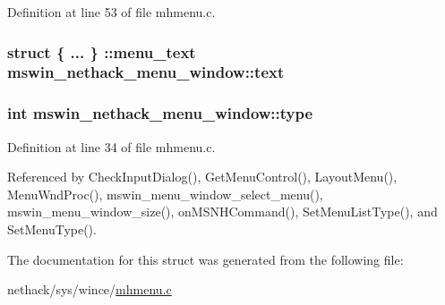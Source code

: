 Definition at line 53 of file mhmenu.\+c.

\hypertarget{structmswin__nethack__menu__window_a1b4707907cd2840714c88e2416689505}{
\subsubsection[{text}]{\setlength{\rightskip}{0pt plus 5cm}struct \{ ... \} \+::menu\+\_\+text  mswin\+\_\+nethack\+\_\+menu\+\_\+window\+::text}}\label{structmswin__nethack__menu__window_a1b4707907cd2840714c88e2416689505}
\hypertarget{structmswin__nethack__menu__window_ab0fda81d90930a6d45dd16aeb8ce4f8a}{
\subsubsection[{type}]{\setlength{\rightskip}{0pt plus 5cm}int mswin\+\_\+nethack\+\_\+menu\+\_\+window\+::type}}\label{structmswin__nethack__menu__window_ab0fda81d90930a6d45dd16aeb8ce4f8a}


Definition at line 34 of file mhmenu.\+c.



Referenced by Check\+Input\+Dialog(), Get\+Menu\+Control(), Layout\+Menu(), Menu\+Wnd\+Proc(), mswin\+\_\+menu\+\_\+window\+\_\+select\+\_\+menu(), mswin\+\_\+menu\+\_\+window\+\_\+size(), on\+M\+S\+N\+H\+Command(), Set\+Menu\+List\+Type(), and Set\+Menu\+Type().



The documentation for this struct was generated from the following file\+:\begin{DoxyCompactItemize}
\item 
nethack/sys/wince/\hyperlink{sys_2wince_2mhmenu_8c}{mhmenu.\+c}\end{DoxyCompactItemize}
